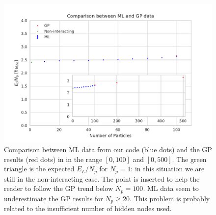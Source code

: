 \begin{figure}[H]
	\centering
	\centerline{\includegraphics[scale=1.2]{plot_finale.pdf}}
	\caption{Comparison between ML data from our code (blue dots) and the GP results (red dots) in \cite{DalfString} in the range $[0,100]$ and $[0,500]$. The green triangle is the expected $E_L/N_p$ for $N_p=1$: in this situation we are still in the non-interacting case. The point is inserted to help the reader to follow the GP trend below $N_p=100$. ML data seem to underestimate the GP results for $N_p\geq 20$. This problem is probably related to the insufficient number of hidden nodes used.}
	\label{Fig:9}
\end{figure} 